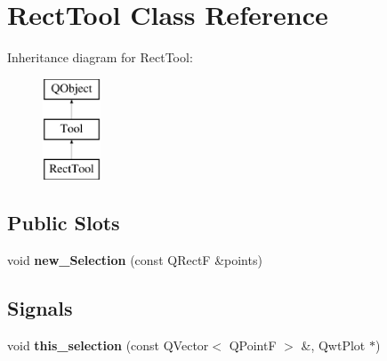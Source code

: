\hypertarget{classRectTool}{}\section{Rect\+Tool Class Reference}
\label{classRectTool}
Inheritance diagram for Rect\+Tool\+:\begin{figure}[H]
\begin{center}
\leavevmode
\includegraphics[height=3.000000cm]{classRectTool}
\end{center}
\end{figure}
\subsection*{Public Slots}
\begin{DoxyCompactItemize}
\item 
\mbox{\label{classRectTool_a3a2b0b9e208c876e08588378fe90aac4}} 
void {\bfseries new\+\_\+\+Selection} (const Q\+RectF \&points)
\end{DoxyCompactItemize}
\subsection*{Signals}
\begin{DoxyCompactItemize}
\item 
\mbox{\label{classTool_a68dea3e4c911f3174176084d350865cc}} 
void {\bfseries this\+\_\+selection} (const Q\+Vector$<$ Q\+PointF $>$ \&, Qwt\+Plot $\ast$)
\end{DoxyCompactItemize}
